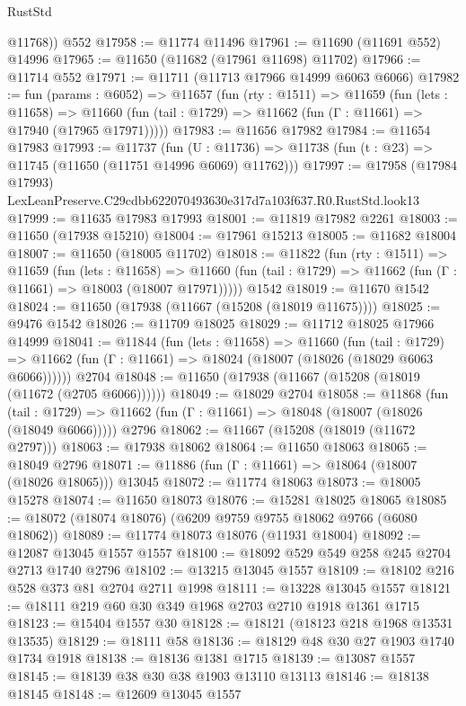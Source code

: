 \begin{lexlean}{RustStd}
\begin{coremodule}
        @11768))
    @552
@17958 := @11774 @11496
@17961 := @11690 (@11691 @552) @14996
@17965 := @11650 (@11682 (@17961 @11698) @11702)
@17966 := @11714 @552
@17971 := @11711 (@11713 @17966 @14999 @6063 @6066)
@17982 := fun (params : @6052) =>
  @11657
    (fun (rty : @1511) =>
    @11659
      (fun (lets : @11658) =>
      @11660 (fun (tail : @1729) => @11662 (fun (Γ : @11661) => @17940 (@17965 @17971)))))
@17983 := @11656 @17982
@17984 := @11654 @17983
@17993 := @11737
    (fun (U : @11736) => @11738 (fun (t : @23) => @11745 (@11650 (@11751 @14996 @6069) @11762)))
@17997 := @17958 (@17984 @17993) LexLeanPreserve.C29cdbb622070493630e317d7a103f637.R0.RustStd.look13
@17999 := @11635 @17983 @17993
@18001 := @11819 @17982 @2261
@18003 := @11650 (@17938 @15210)
@18004 := @17961 @15213
@18005 := @11682 @18004
@18007 := @11650 (@18005 @11702)
@18018 := @11822
    (fun (rty : @1511) =>
    @11659
      (fun (lets : @11658) =>
      @11660 (fun (tail : @1729) => @11662 (fun (Γ : @11661) => @18003 (@18007 @17971)))))
    @1542
@18019 := @11670 @1542
@18024 := @11650 (@17938 (@11667 (@15208 (@18019 @11675))))
@18025 := @9476 @1542
@18026 := @11709 @18025
@18029 := @11712 @18025 @17966 @14999
@18041 := @11844
    (fun (lets : @11658) =>
    @11660
      (fun (tail : @1729) =>
      @11662 (fun (Γ : @11661) => @18024 (@18007 (@18026 (@18029 @6063 @6066))))))
    @2704
@18048 := @11650 (@17938 (@11667 (@15208 (@18019 (@11672 (@2705 @6066))))))
@18049 := @18029 @2704
@18058 := @11868
    (fun (tail : @1729) => @11662 (fun (Γ : @11661) => @18048 (@18007 (@18026 (@18049 @6066)))))
    @2796
@18062 := @11667 (@15208 (@18019 (@11672 @2797)))
@18063 := @17938 @18062
@18064 := @11650 @18063
@18065 := @18049 @2796
@18071 := @11886 (fun (Γ : @11661) => @18064 (@18007 (@18026 @18065))) @13045
@18072 := @11774 @18063
@18073 := @18005 @15278
@18074 := @11650 @18073
@18076 := @15281 @18025 @18065
@18085 := @18072 (@18074 @18076) (@6209 @9759 @9755 @18062 @9766 (@6080 @18062))
@18089 := @11774 @18073 @18076 (@11931 @18004)
@18092 := @12087 @13045 @1557 @1557
@18100 := @18092 @529 @549 @258 @245 @2704 @2713 @1740 @2796
@18102 := @13215 @13045 @1557
@18109 := @18102 @216 @528 @373 @81 @2704 @2711 @1998
@18111 := @13228 @13045 @1557
@18121 := @18111 @219 @60 @30 @349 @1968 @2703 @2710 @1918 @1361 @1715
@18123 := @15404 @1557 @30
@18128 := @18121 (@18123 @218 @1968 @13531 @13535)
@18129 := @18111 @58
@18136 := @18129 @48 @30 @27 @1903 @1740 @1734 @1918
@18138 := @18136 @1381 @1715
@18139 := @13087 @1557
@18145 := @18139 @38 @30 @38 @1903 @13110 @13113
@18146 := @18138 @18145
@18148 := @12609 @13045 @1557

\end{coremodule}
\end{lexlean}

